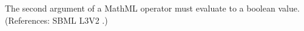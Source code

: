 The second argument of a MathML  operator must evaluate to
a boolean value.  (References: SBML L3V2 .)
